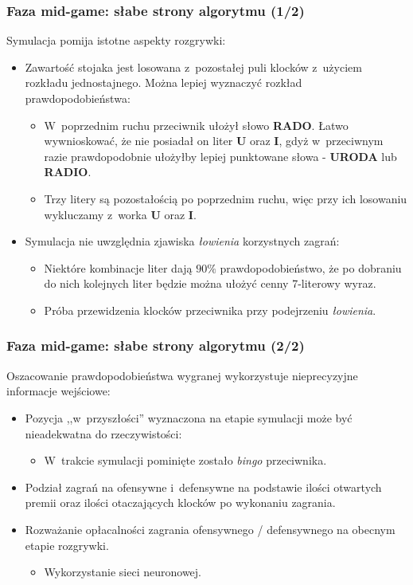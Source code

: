 \documentclass[10pt,a4paper]{beamer}
\begin{document}
\begin{frame}
	\frametitle{Faza mid-game: słabe strony algorytmu (1/2)}

	Symulacja pomija istotne aspekty rozgrywki:

	\begin{itemize}
		\item Zawartość stojaka jest losowana z~pozostałej puli klocków z~użyciem rozkładu jednostajnego. Można lepiej wyznaczyć rozkład prawdopodobieństwa:
		\begin{itemize}
			\item W~poprzednim ruchu przeciwnik ułożył słowo \textbf{RADO}. Łatwo wywnioskować, że nie posiadał on liter \textbf{U} oraz \textbf{I}, gdyż w~przeciwnym razie prawdopodobnie ułożyłby lepiej punktowane słowa - \textbf{URODA} lub \textbf{RADIO}.
			\item Trzy litery są pozostałością po poprzednim ruchu, więc przy ich losowaniu wykluczamy z~worka \textbf{U} oraz \textbf{I}.
		\end{itemize}
		\item Symulacja nie uwzględnia zjawiska \emph{łowienia} korzystnych zagrań:
		\begin{itemize}
			\item Niektóre kombinacje liter dają $90\%$ prawdopodobieństwo, że po dobraniu do nich kolejnych liter będzie można ułożyć cenny 7-literowy wyraz.
			\item Próba przewidzenia klocków przeciwnika przy podejrzeniu \emph{łowienia}.
		\end{itemize}
	\end{itemize}
\end{frame}

\begin{frame}
	\frametitle{Faza mid-game: słabe strony algorytmu (2/2)}
	
	Oszacowanie prawdopodobieństwa wygranej wykorzystuje nieprecyzyjne informacje wejściowe:

	\begin{itemize}
		\item Pozycja ,,w~przyszłości'' wyznaczona na etapie symulacji może być nieadekwatna do rzeczywistości:
		\begin{itemize}
			\item W~trakcie symulacji pominięte zostało \emph{bingo} przeciwnika.
		\end{itemize}
		\item Podział zagrań na ofensywne i~defensywne na podstawie ilości otwartych premii oraz ilości otaczających klocków po wykonaniu zagrania.
		\item Rozważanie opłacalności zagrania ofensywnego / defensywnego na obecnym etapie rozgrywki. 
		\begin{itemize}
			\item Wykorzystanie sieci neuronowej.
		\end{itemize}
	\end{itemize}
	
\end{frame}
\end{document}
